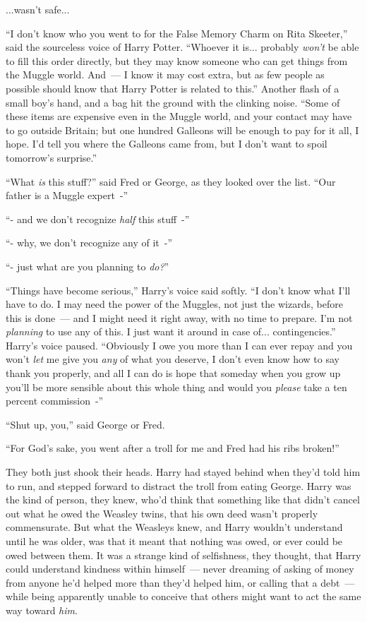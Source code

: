 ...wasn't safe...

``I don't know who you went to for the False Memory Charm on Rita Skeeter,'' said the sourceless voice of Harry Potter. ``Whoever it is... probably \emph{won't} be able to fill this order directly, but they may know someone who can get things from the Muggle world. And~--- I know it may cost extra, but as few people as possible should know that Harry Potter is related to this.'' Another flash of a small boy's hand, and a bag hit the ground with the clinking noise. ``Some of these items are expensive even in the Muggle world, and your contact may have to go outside Britain; but one hundred Galleons will be enough to pay for it all, I hope. I'd tell you where the Galleons came from, but I don't want to spoil tomorrow's surprise.''

``What \emph{is} this stuff?'' said Fred or George, as they looked over the list. ``Our father is a Muggle expert~-''

``- and we don't recognize \emph{half} this stuff~-''

``- why, we don't recognize any of it~-''

``- just what are you planning to \emph{do?}''

``Things have become serious,'' Harry's voice said softly. ``I don't know what I'll have to do. I may need the power of the Muggles, not just the wizards, before this is done~--- and I might need it right away, with no time to prepare. I'm not \emph{planning} to use any of this. I just want it around in case of... contingencies.'' Harry's voice paused. ``Obviously I owe you more than I can ever repay and you won't \emph{let} me give you \emph{any} of what you deserve, I don't even know how to say thank you properly, and all I can do is hope that someday when you grow up you'll be more sensible about this whole thing and would you \emph{please} take a ten percent commission~-''

``Shut up, you,'' said George or Fred.

``For God's sake, you went after a troll for me and Fred had his ribs broken!''

They both just shook their heads. Harry had stayed behind when they'd told him to run, and stepped forward to distract the troll from eating George. Harry was the kind of person, they knew, who'd think that something like that didn't cancel out what he owed the Weasley twins, that his own deed wasn't properly commensurate. But what the Weasleys knew, and Harry wouldn't understand until he was older, was that it meant that nothing was owed, or ever could be owed between them. It was a strange kind of selfishness, they thought, that Harry could understand kindness within himself~--- never dreaming of asking of money from anyone he'd helped more than they'd helped him, or calling that a debt~--- while being apparently unable to conceive that others might want to act the same way toward \emph{him}.

